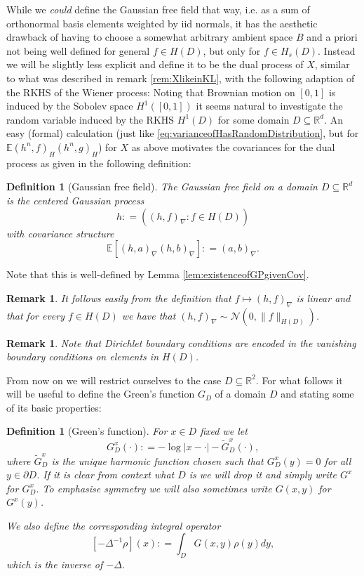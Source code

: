 \documentclass[11pt,reqno]{amsart}
\numberwithin{equation}{section}
\newtheorem{defi}[thm]{Definition}
\newtheorem{rem}[thm]{Remark}
\newcommand{\deq}{\mathrel{\mathop:}=}
\begin{document}
While we \emph{could} define the Gaussian free field that way, i.e. as a sum of orthonormal basis elements weighted by iid normals, it has the aesthetic drawback of having to choose a somewhat arbitrary ambient space $B$ and a priori not being well defined for general $f\in H(D)$, but only for $f\in H_s(D)$. Instead we will be slightly less explicit and define it to be the dual process of $X$, similar to what was described in remark \ref{rem:XlikeinKL}, with the following adaption of the RKHS of the Wiener process: Noting that Brownian motion on $[0,1]$ is induced by the Sobolev space $H^1([0,1])$ it seems natural to investigate the random variable induced by the RKHS $H^1(D)$ for some domain $D\subseteq\mathbb R^d$. An easy (formal) calculation (just like \eqref{eq:varianceofHasRandomDistribution}, but for $\mathbb E(h^n,f)_H(h^n,g)_H$) for $X$ as above motivates the covariances for the dual process as given in the following definition:

\begin{defi}[Gaussian free field]\label{def:GFF}
	The Gaussian free field on a domain $D\subseteq\mathbb R^d$ is the centered Gaussian process $$h\deq ((h,f)_\nabla : f\in H(D))$$ with covariance structure $$\mathbb E[(h,a)_\nabla(h,b)_\nabla]\deq (a,b)_\nabla.$$
\end{defi}
Note that this is well-defined by Lemma \ref{lem:existenceofGPgivenCov}.
\begin{rem}
	It follows easily from the definition that $f\mapsto (h,f)_\nabla$ is linear and that for every $f\in H(D)$ we have that $(h,f)_\nabla\sim\mathcal N(0,\|f\|_{H(D)})$.
\end{rem}

\begin{rem}
	Note that Dirichlet boundary conditions are encoded in the vanishing boundary conditions on elements in $H(D)$. %
\end{rem}

From now on we will restrict ourselves to the case $D\subseteq\mathbb R^2$. For what follows it will be useful to define the Green's function $G_D$ of a domain $D$ and stating some of its basic properties:

\begin{defi}[Green's function]
	For $x\in D$ fixed we let $$G_D^x(\cdot)\deq -\log|x-\cdot|-\tilde G_D^x(\cdot),$$ where $\tilde G_D^x$ is the unique harmonic function chosen such that $G_D^x(y)=0$ for all $y\in\partial D$.
	If it is clear from context what $D$ is we will drop it and simply write $G^x$ for $G^x_D$.
	To emphasise symmetry we will also sometimes write $G(x,y)$ for $G^x(y)$.
	
	We also define the corresponding integral operator $$[-\Delta^{-1}\rho](x)\deq\int_D G(x,y)\rho(y)dy,$$ which is the inverse of $-\Delta$.
\end{defi}
\end{document}
